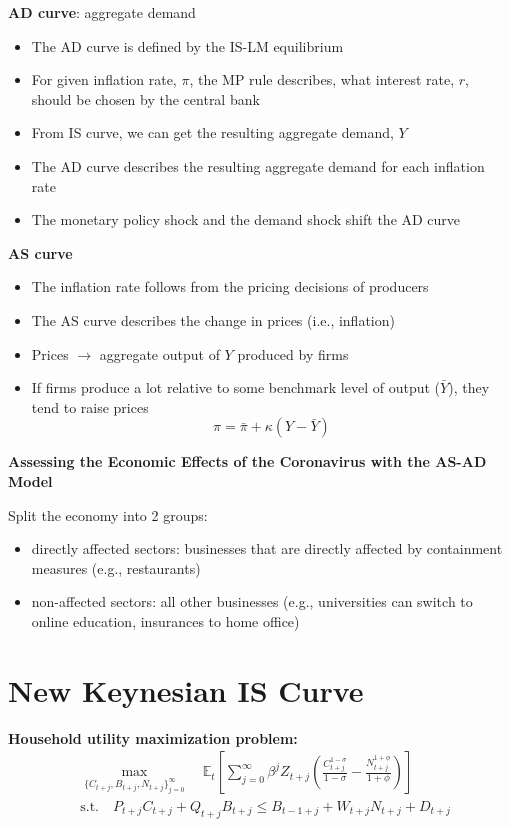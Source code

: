 \documentclass{article}
\begin{document}
\textbf{AD curve}: aggregate demand

\begin{itemize}
    \item The AD curve is defined by the IS-LM equilibrium
    \item For given inflation rate, $\pi$, the MP rule describes, what interest rate, $r$, should be chosen by the central bank
    \item From IS curve, we can get the resulting aggregate demand, $Y$
    \item The AD curve describes the resulting aggregate demand for each inflation rate
    \item The monetary policy shock and the demand shock shift the AD curve
\end{itemize}

\textbf{AS curve}

\begin{itemize}
    \item The inflation rate follows from the pricing decisions of producers
    \item The AS curve describes the change in prices (i.e., inflation)
    \item Prices $\to$ aggregate output of $Y$ produced by firms
    \item If firms produce a lot relative to some benchmark level of output ($\bar{Y}$), they tend to raise prices
    \[\pi = \bar{\pi} + \kappa(Y - \bar{Y}) \]
\end{itemize}

\textbf{Assessing the Economic Effects of the Coronavirus with the AS-AD Model}

Split the economy into 2 groups:

\begin{itemize}
    \item directly affected sectors: businesses that are directly affected by containment measures (e.g., restaurants)
    \item non-affected sectors: all other businesses (e.g., universities can switch to online education, insurances to home office)
\end{itemize}


\section{New Keynesian IS Curve}

\textbf{Household utility maximization problem:}
\begin{align*}
    & \max_{\{C_{t+j},B_{t+j},N_{t+j} \}_{j=0}^{\infty}} \quad 
    \mathbb{E}_t\left[
    \sum_{j=0}^{\infty}\beta^j Z_{t+j}
    \left(
    \frac{ C_{t+j}^{1-\sigma} }{1-\sigma} -
    \frac{ N_{t+j}^{1+\phi} }{1+\phi} 
    \right) \right] \\
    & \textrm{s.t.} \quad 
    P_{t+j}C_{t+j}+Q_{t+j}B_{t+j}\leq B_{t-1+j}+W_{t+j}N_{t+j}+D_{t+j} 
\end{align*}
\end{document}
